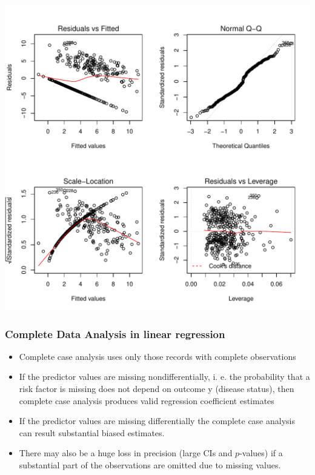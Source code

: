 \documentclass{beamer}\usepackage[]{graphicx}\usepackage[]{color}
\newenvironment{knitrout}{}{} %
\begin{document}
{{{\begin{frame}[fragile]
\begin{knitrout}
{\centering \includegraphics[width=0.7\linewidth]{figure/unnamed-chunk-95-1} 

}



\end{knitrout}
\end{frame}

\begin{frame}
\frametitle{Complete Data Analysis in linear regression}
\begin{itemize}
\item Complete case analysis uses only those records with complete observations
\item If the predictor values are missing nondifferentially, i. e. the probability
that a risk factor is missing does not depend on outcome y (disease status),
then complete case analysis produces valid regression coefficient estimates
\item If the predictor values are missing differentially the complete case
analysis can result substantial biased estimates.
\item There may also be a huge loss in precision (large CIs and $p$-values) if
a substantial part of the observations are omitted due to missing values.
\end{itemize}
\end{frame}

}}}
\end{document}
